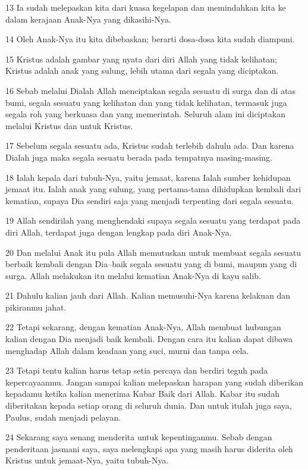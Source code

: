 \par 13 Ia sudah melepaskan kita dari kuasa kegelapan dan memindahkan kita ke dalam kerajaan Anak-Nya yang dikasihi-Nya.
\par 14 Oleh Anak-Nya itu kita dibebaskan; berarti dosa-dosa kita sudah diampuni.
\par 15 Kristus adalah gambar yang nyata dari diri Allah yang tidak kelihatan; Kristus adalah anak yang sulung, lebih utama dari segala yang diciptakan.
\par 16 Sebab melalui Dialah Allah menciptakan segala sesuatu di surga dan di atas bumi, segala sesuatu yang kelihatan dan yang tidak kelihatan, termasuk juga segala roh yang berkuasa dan yang memerintah. Seluruh alam ini diciptakan melalui Kristus dan untuk Kristus.
\par 17 Sebelum segala sesuatu ada, Kristus sudah terlebih dahulu ada. Dan karena Dialah juga maka segala sesuatu berada pada tempatnya masing-masing.
\par 18 Ialah kepala dari tubuh-Nya, yaitu jemaat, karena Ialah sumber kehidupan jemaat itu. Ialah anak yang sulung, yang pertama-tama dihidupkan kembali dari kematian, supaya Dia sendiri saja yang menjadi terpenting dari segala sesuatu.
\par 19 Allah sendirilah yang menghendaki supaya segala sesuatu yang terdapat pada diri Allah, terdapat juga dengan lengkap pada diri Anak-Nya.
\par 20 Dan melalui Anak itu pula Allah memutuskan untuk membuat segala sesuatu berbaik kembali dengan Dia--baik segala sesuatu yang di bumi, maupun yang di surga. Allah melakukan itu melalui kematian Anak-Nya di kayu salib.
\par 21 Dahulu kalian jauh dari Allah. Kalian memusuhi-Nya karena kelakuan dan pikiranmu jahat.
\par 22 Tetapi sekarang, dengan kematian Anak-Nya, Allah membuat hubungan kalian dengan Dia menjadi baik kembali. Dengan cara itu kalian dapat dibawa menghadap Allah dalam keadaan yang suci, murni dan tanpa cela.
\par 23 Tetapi tentu kalian harus tetap setia percaya dan berdiri teguh pada kepercayaanmu. Jangan sampai kalian melepaskan harapan yang sudah diberikan kepadamu ketika kalian menerima Kabar Baik dari Allah. Kabar itu sudah diberitakan kepada setiap orang di seluruh dunia. Dan untuk itulah juga saya, Paulus, sudah menjadi pelayan.
\par 24 Sekarang saya senang menderita untuk kepentinganmu. Sebab dengan penderitaan jasmani saya, saya melengkapi apa yang masih harus diderita oleh Kristus untuk jemaat-Nya, yaitu tubuh-Nya.
